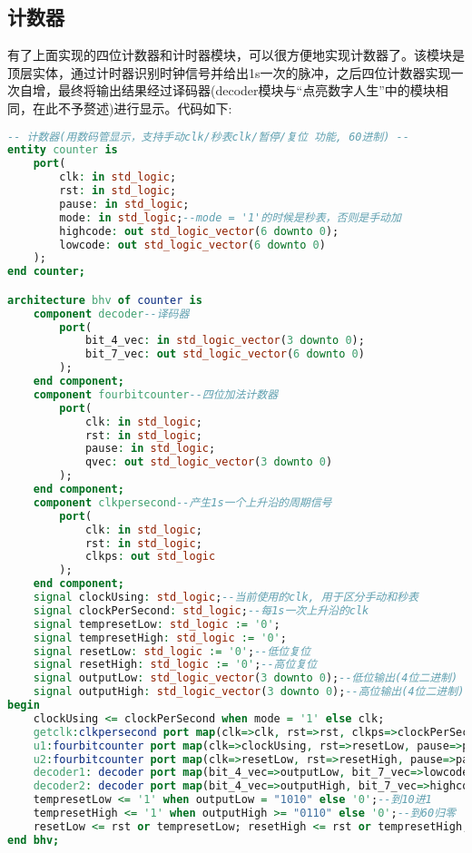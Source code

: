 \documentclass[UTF8, onecolumn, a4paper]{article}
\begin{document}
\subsection{计数器}
有了上面实现的四位计数器和计时器模块，可以很方便地实现计数器了。该模块是顶层实体，通过计时器识别时钟信号并给出1s一次的脉冲，之后四位计数器实现一次自增，最终将输出结果经过译码器(decoder模块与“点亮数字人生”中的模块相同，在此不予赘述)进行显示。代码如下:
\begin{lstlisting}[language={VHDL}, title={counter.vhd}]
-- 计数器(用数码管显示，支持手动clk/秒表clk/暂停/复位 功能, 60进制) --
entity counter is
	port(
		clk: in std_logic;
		rst: in std_logic;
		pause: in std_logic;
		mode: in std_logic;--mode = '1'的时候是秒表，否则是手动加
		highcode: out std_logic_vector(6 downto 0);
		lowcode: out std_logic_vector(6 downto 0)
	);
end counter;

architecture bhv of counter is
	component decoder--译码器
		port(
			bit_4_vec: in std_logic_vector(3 downto 0);
			bit_7_vec: out std_logic_vector(6 downto 0)
		);
	end component;
	component fourbitcounter--四位加法计数器
		port(
			clk: in std_logic;
			rst: in std_logic;
			pause: in std_logic;
			qvec: out std_logic_vector(3 downto 0)
		);
	end component;
	component clkpersecond--产生1s一个上升沿的周期信号
		port(
			clk: in std_logic;
			rst: in std_logic;
			clkps: out std_logic
		);
	end component;
    signal clockUsing: std_logic;--当前使用的clk, 用于区分手动和秒表
	signal clockPerSecond: std_logic;--每1s一次上升沿的clk
	signal tempresetLow: std_logic := '0';
	signal tempresetHigh: std_logic := '0';
	signal resetLow: std_logic := '0';--低位复位
	signal resetHigh: std_logic := '0';--高位复位
	signal outputLow: std_logic_vector(3 downto 0);--低位输出(4位二进制)
	signal outputHigh: std_logic_vector(3 downto 0);--高位输出(4位二进制)
begin
	clockUsing <= clockPerSecond when mode = '1' else clk;
	getclk:clkpersecond port map(clk=>clk, rst=>rst, clkps=>clockPerSecond);
	u1:fourbitcounter port map(clk=>clockUsing, rst=>resetLow, pause=>pause, qvec=>outputLow );
	u2:fourbitcounter port map(clk=>resetLow, rst=>resetHigh, pause=>pause, qvec=>outputHigh );
	decoder1: decoder port map(bit_4_vec=>outputLow, bit_7_vec=>lowcode);
	decoder2: decoder port map(bit_4_vec=>outputHigh, bit_7_vec=>highcode);
	tempresetLow <= '1' when outputLow = "1010" else '0';--到10进1   
	tempresetHigh <= '1' when outputHigh >= "0110" else '0';--到60归零
	resetLow <= rst or tempresetLow; resetHigh <= rst or tempresetHigh;
end bhv;
\end{lstlisting}
\end{document}

